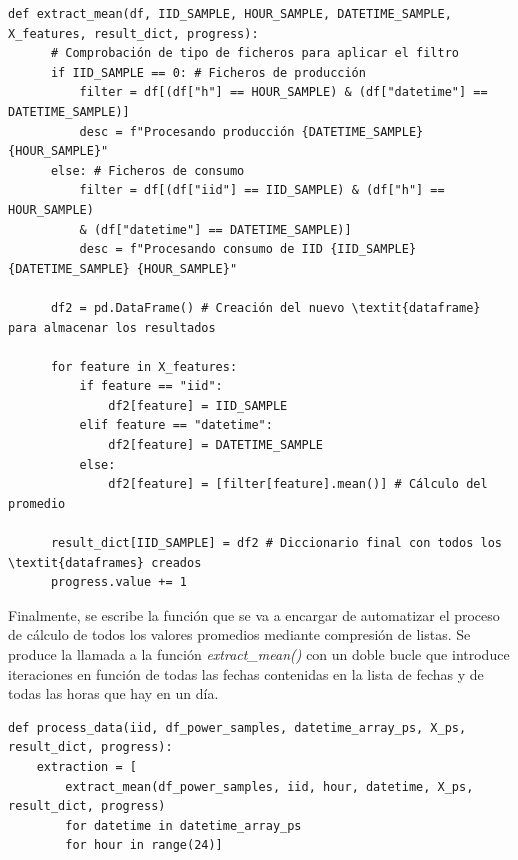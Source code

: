 \vspace{3mm}

\begin{lstlisting}[style=Python, caption={Función de cálculo del promedio}]
  def extract_mean(df, IID_SAMPLE, HOUR_SAMPLE, DATETIME_SAMPLE, X_features, result_dict, progress):
      # Comprobación de tipo de ficheros para aplicar el filtro
      if IID_SAMPLE == 0: # Ficheros de producción
          filter = df[(df["h"] == HOUR_SAMPLE) & (df["datetime"] == DATETIME_SAMPLE)]
          desc = f"Procesando producción {DATETIME_SAMPLE} {HOUR_SAMPLE}"
      else: # Ficheros de consumo
          filter = df[(df["iid"] == IID_SAMPLE) & (df["h"] == HOUR_SAMPLE) 
          & (df["datetime"] == DATETIME_SAMPLE)]
          desc = f"Procesando consumo de IID {IID_SAMPLE} {DATETIME_SAMPLE} {HOUR_SAMPLE}"

      df2 = pd.DataFrame() # Creación del nuevo \textit{dataframe} para almacenar los resultados

      for feature in X_features:
          if feature == "iid":
              df2[feature] = IID_SAMPLE
          elif feature == "datetime":
              df2[feature] = DATETIME_SAMPLE
          else:
              df2[feature] = [filter[feature].mean()] # Cálculo del promedio

      result_dict[IID_SAMPLE] = df2 # Diccionario final con todos los \textit{dataframes} creados
      progress.value += 1
\end{lstlisting}

\vspace{3mm}

Finalmente, se escribe la función que se va a encargar de automatizar el proceso de cálculo de todos los valores promedios mediante compresión de listas. Se produce la llamada a la función \textit{extract\_mean()} con un doble bucle que introduce iteraciones en función de todas las fechas contenidas en la lista de fechas y de todas las horas que hay en un día.

\vspace{3mm}

\begin{lstlisting}[style=Python, caption={Función de automatización del cálculo del promedio}]
  def process_data(iid, df_power_samples, datetime_array_ps, X_ps, result_dict, progress):
    extraction = [
        extract_mean(df_power_samples, iid, hour, datetime, X_ps, result_dict, progress)
        for datetime in datetime_array_ps
        for hour in range(24)]
\end{lstlisting}

